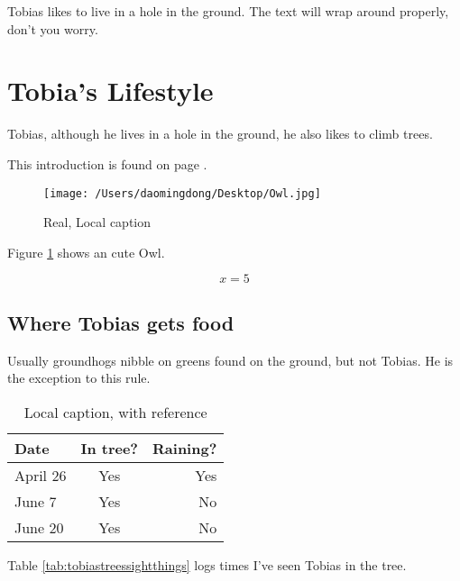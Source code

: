 \documentclass{article}
\begin{document}
Tobias likes to live in a hole in the ground. The text will wrap around properly, don't you worry.


\lipsum[1]

\newpage
\section{Tobia's Lifestyle}
Tobias, although he lives in a hole in the ground, he also likes to climb trees. \cite{ref:zan}

This introduction is found on page \pageref{sec:intro}.
\begin{figure}[H]
	\centering
	\texttt{[image: /Users/daomingdong/Desktop/Owl.jpg]}
	\caption[Optional caption]{Real, Local caption}
	\label{fig:Owl}
\end{figure}

Figure \ref{fig:Owl} shows an cute Owl.

\begin{equation}
x = 5
\end{equation}
\subsection{Where Tobias gets food}
Usually groundhogs nibble on greens found on the ground, but not Tobias. He is the exception to this rule.

\begin{table}[H]
	\centering
	\label{tab:tobiastreesightings}
	\caption[This is optional caption, without reference]{Local caption, with reference \cite{ref:two,ref:zan}} 
	\begin{tabular}{ l c r }
		\bfseries{Date} & In tree? & Raining? \\ \hline
		April 26 & Yes & Yes \\
		June 7 & Yes & No \\
		June 20 & Yes & No \\
	\end{tabular}

\end{table}

Table \ref{tab:tobiastreessightthings} logs times I've seen Tobias in the tree.
\end{document}
